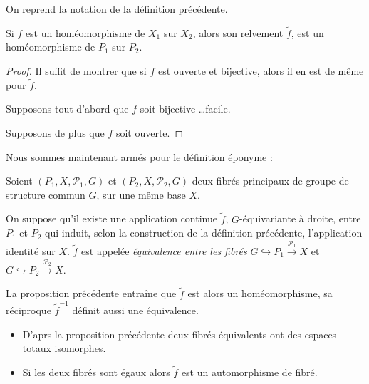 \begin{prop}
On reprend la notation de la d\'efinition pr\'ec\'edente.

\par
Si $f$ est un hom\'eomorphisme de $X_1$ sur $X_2$, alors son relvement $\tilde{f}$, est un hom\'eomorphisme de $P_1$ sur $P_2$.
\end{prop}

\begin{proof}
Il suffit de montrer que si $f$ est ouverte et bijective, alors il en est de m\^eme pour $\tilde{f}$.

\par
Supposons tout d'abord que $f$ soit bijective \dots facile.

\par
Supposons de plus que $f$ soit ouverte. \tr%
\end{proof}

Nous sommes maintenant arm\'es pour le d\'efinition \'eponyme :

\begin{defi}
Soient $(P_1,X,\mathcal{P}_1,G)$ et $(P_2,X,\mathcal{P}_2,G)$ deux fibr\'es principaux de groupe de structure commun $G$, sur une m\^eme base $X$.

\par
On suppose qu'il existe une application continue $\tilde{f}$, $G$-\'equivariante à droite, entre $P_1$ et $P_2$ qui induit, selon la construction de la d\'efinition pr\'ec\'edente, %
l'application identit\'e sur $X$. %
$\tilde{f}$ est appelée \emph{\'equivalence entre les fibr\'es} $G\hookrightarrow P_1 \xrightarrow{\mathcal{P}_1} X$ et $G\hookrightarrow P_2 \xrightarrow{\mathcal{P}_2} X$.

\par
La proposition pr\'ec\'edente entra\^ine que $\tilde{f}$ est alors un hom\'eomorphisme, sa réciproque $\tilde{f}^{-1}$ d\'efinit aussi une \'equivalence.
\end{defi}

\begin{rema}
\begin{itemize}
\item D'aprs la proposition pr\'ec\'edente deux fibr\'es \'equivalents ont des espaces totaux isomorphes.
\item Si les deux fibr\'es sont \'egaux alors $\tilde{f}$ est un automorphisme de fibr\'e.
\end{itemize}
\end{rema}

